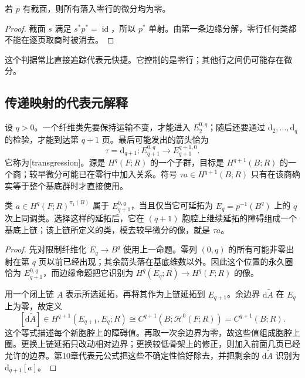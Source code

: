 \begin{corollary}\label{g2:cor:serre-section-bottom-row}
	若 \(p\) 有截面，则所有落入零行的微分均为零。
\end{corollary}
\begin{proof}
	截面 \(s\) 满足 \(s^*p^*=\operatorname{id}\)，所以 \(p^*\) 单射。由第一条边缘分解，零行任何类都不能在逐页取商时被消去。
\end{proof}

这个判据常比直接追踪代表元快捷。它控制的是零行；其他行之间仍可能存在微分。

\subsection{传递映射的代表元解释}
\label{g2:subsec:1102:03}

设 \(q>0\)。一个纤维类先要保持运输不变，才能进入 \(E_2^{0,q}\)；随后还要通过 \(\mathrm d_2,\ldots,\mathrm d_q\) 的检验，才能到达第 \(q+1\) 页。最后可能发出的箭头恰为
\begin{equation}\label{g2:eq:serre-transgression}
	\tau=\mathrm d_{q+1}:E_{q+1}^{0,q}\longrightarrow E_{q+1}^{q+1,0}.
\end{equation}
它称为[transgression]。源是 \(H^q(F;R)\) 的一个子群，目标是 \(H^{q+1}(B;R)\) 的一个商；较早微分可能已在零行中加入关系。符号 \(\tau a\in H^{q+1}(B;R)\) 只有在该商确实等于整个基底群时才直接使用。

\begin{proposition}\label{g2:prop:serre-transgression}
	类 \(a\in H^q(F;R)^{\pi_1(B)}\) 属于 \(E_{q+1}^{0,q}\)，当且仅当它可延拓为 \(E_q=p^{-1}(B^q)\) 上的 \(q\) 次上同调类。选择这样的延拓后，它在 \((q+1)\) 胞腔上继续延拓的障碍组成一个基底上链；该上链所定义的类，模去较早微分的像，就是 \(\tau a\)。
\end{proposition}
\begin{proof}
	先对限制纤维化 \(E_q\to B^q\) 使用上一命题。零列 \((0,q)\) 的所有可能非零出射在第 \(q\) 页以前已经出现；其余箭头落在基底维数以外。因此这个位置的永久圈恰为 \(E_{q+1}^{0,q}\)，而边缘命题把它识别为 \(H^q(E_q;R)\to H^q(F;R)\) 的像。

	用一个闭上链 \(A\) 表示所选延拓，再将其作为上链延拓到 \(E_{q+1}\)。余边界 \(\mathrm d\widetilde A\) 在 \(E_q\) 上为零，故定义
	\[
		[\mathrm d\widetilde A]\in H^{q+1}(E_{q+1},E_q;R)
		\cong C^{q+1}(B;\mathcal H^0(F;R))=C^{q+1}(B;R).
	\]
	这个等式描述每个新胞腔上的障碍值。再取一次余边界为零，故这些值组成胞腔上圈。更换上链延拓只改动相对边界；更换较低骨架上的修正，则加入前面几页已经允许的边界。第10章代表元公式把这些不确定性恰好除去，并把剩余的 \(\mathrm d\widetilde A\) 识别为 \(\mathrm d_{q+1}[a]\)。
\end{proof}

